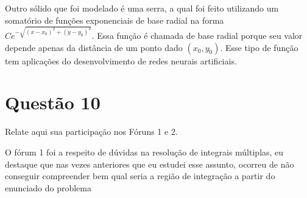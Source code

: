 \documentclass[10pt,a4paper]{article}
\begin{document}
	Outro sólido que foi modelado é uma serra, a qual foi feito utilizando um somatório de funções exponenciais de base radial na forma $ Ce^{-\sqrt{(x-x_0)^2 + (y-y_0)^2}} $. Essa função é chamada de base radial porque seu valor depende apenas da distância de um ponto dado $(x_0, y_0)$. Esse tipo de função tem aplicações do desenvolvimento de redes neurais artificiais.
	
	\section*{Questão 10}
	
	Relate aqui sua participação nos Fóruns 1 e 2.
	
	O fórum 1 foi a respeito de dúvidas na resolução de integrais múltiplas, eu destaque que nas vezes anteriores que eu estudei esse assunto, ocorreu de não conseguir compreender bem qual seria a região de integração a partir do enunciado do problema
	
	
\end{document}

